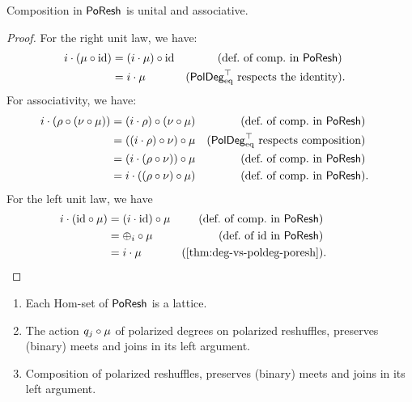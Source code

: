 \documentclass[a4paper]{memoir}
\begin{document}
\begin{proposition}
	Composition in $\mathsf{PoResh}$ is unital and associative.
\end{proposition}
\begin{proof}
	For the right unit law, we have:
	\begin{align*}
		i \cdot (\mu \circ \mathrm{id})
		&= (i \cdot \mu) \circ \mathrm{id}
		& \text{(def.\ of comp.\ in $\mathsf{PoResh}$)} \\
		&= i \cdot \mu
		& \text{($\mathsf{PolDeg}_{\mathrm{eq}}^\top$ respects the identity)}&.
	\end{align*}
	For associativity, we have:
	\begin{align*}
		i \cdot (\rho \circ (\nu \circ \mu))
		&= (i \cdot \rho) \circ (\nu \circ \mu)
		& \text{(def.\ of comp.\ in $\mathsf{PoResh}$)} \\
		&= ((i \cdot \rho) \circ \nu) \circ \mu
		& \text{($\mathsf{PolDeg}_{\mathrm{eq}}^\top$ respects composition)} \\
		&= (i \cdot (\rho \circ \nu)) \circ \mu
		& \text{(def.\ of comp.\ in $\mathsf{PoResh}$)} \\
		&= i \cdot ((\rho \circ \nu) \circ \mu)
		& \text{(def.\ of comp.\ in $\mathsf{PoResh}$)}&.
	\end{align*}
	For the left unit law, we have
	\begin{align*}
		i \cdot (\id \circ \mu)
		&= (i \cdot \id) \circ \mu
		& \text{(def.\ of comp.\ in $\poreshcat$)} \\
		&= \pospol_i \circ \mu
		& \text{(def.\ of $\id$ in $\poreshcat$)} \\
		&= i \cdot \mu
		& \text{(\cref{thm:deg-vs-poldeg-poresh})}&.
		\qquad \qedhere
	\end{align*}
\end{proof}
\begin{proposition}
	\label{thm:poresh-lattice}
	\label{thm:poldeg-poresh-lattice}
	\label{thm:poresh-poresh-lattice}
	\begin{enumerate}
		\item Each Hom-set of $\mathsf{PoResh}$ is a lattice.
		\item The action ${q}_{j} \circ \mu$ of polarized degrees on polarized reshuffles, preserves (binary) meets and joins in its left argument.
		\item Composition of polarized reshuffles, preserves (binary) meets and joins in its left argument.
	\end{enumerate}
\end{proposition}
\end{document}
